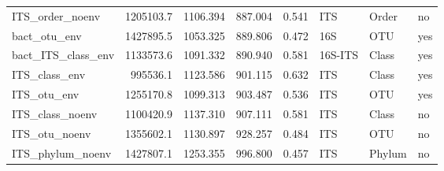 \documentclass[
  10pt,
  letterpaper,
]{article}
\begin{document}
\begin{table}
\begin{tabular}[t]{lrrrrlll}
ITS\_order\_noenv & 1205103.7 & 1106.394 & 887.004 & 0.541 & ITS & Order & no\\
bact\_otu\_env & 1427895.5 & 1053.325 & 889.806 & 0.472 & 16S & OTU & yes\\
bact\_ITS\_class\_env & 1133573.6 & 1091.332 & 890.940 & 0.581 & 16S-ITS & Class & yes\\
ITS\_class\_env & 995536.1 & 1123.586 & 901.115 & 0.632 & ITS & Class & yes\\
\addlinespace
ITS\_otu\_env & 1255170.8 & 1099.313 & 903.487 & 0.536 & ITS & OTU & yes\\
ITS\_class\_noenv & 1100420.9 & 1137.310 & 907.111 & 0.581 & ITS & Class & no\\
ITS\_otu\_noenv & 1355602.1 & 1130.897 & 928.257 & 0.484 & ITS & OTU & no\\
ITS\_phylum\_noenv & 1427807.1 & 1253.355 & 996.800 & 0.457 & ITS & Phylum & no\\
\bottomrule
\end{tabular}
\end{table}


\nolinenumbers
\end{document}
